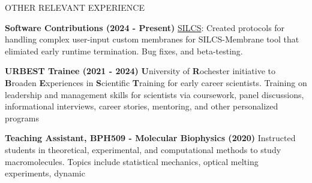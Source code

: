 \documentclass{resume} %
\begin{document}
\begin{rSection}{OTHER RELEVANT EXPERIENCE}
   \vspace{-1.25em}
   \item \textbf{Software Contributions (2024 - Present)} \href{https://silcsbio.com/}{SILCS}: Created protocols for handling complex user-input custom membranes for SILCS-Membrane tool that elimiated early runtime termination. Bug fixes, and beta-testing. 
   \item \textbf{URBEST Trainee (2021 - 2024)} {\textbf{U}niversity of \textbf{R}ochester initiative to \textbf{B}roaden \textbf{E}xperiences in \textbf{S}cientific \textbf{T}raining for early career scientists. Training on leadership and management skills for scientists via coursework, panel discussions, informational interviews, career stories, mentoring, and other personalized programs}
   \item \textbf{Teaching Assistant, BPH509 - Molecular Biophysics (2020)} {Instructed students in theoretical, experimental, and computational methods to study macromolecules. Topics include statistical mechanics, optical melting experiments, dynamic
}
\end{rSection}
\end{document}
